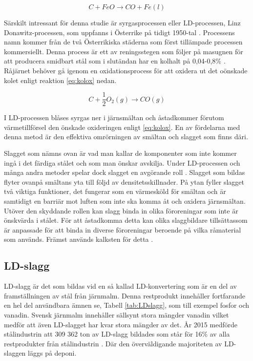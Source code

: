 \begin{equation}
    C+FeO \rightarrow CO + Fe(l)
    \label{eq:järnoxid}
\end{equation}

Särskilt intressant för denna studie är syrgasprocessen eller LD-processen, Linz Donawitz-processen, som uppfanns i Österrike på tidigt 1950-tal \cite{Jernkontoret2000del1}.
Processens namn kommer från de två Österrikiska städerna som först tillämpade processen kommersiellt. Denna process är ett av reningsstegen som följer på masugnen för att producera smidbart stål som i slutändan har en kolhalt på 0,04-0,8\% \cite{Jernkontoret2000del2}.
Råjärnet behöver gå igenom en oxidationsprocess för att oxidera ut det oönskade kolet enligt reaktion \eqref{eq:kolox} nedan.

\begin{equation}
    C +\frac{1}{2} O_{2}(g) \rightarrow CO(g)
    \label{eq:kolox}
\end{equation}

I LD-processen blåses syrgas ner i järnsmältan och åstadkommer förutom värmetillförsel den önskade oxideringen enligt \eqref{eq:kolox}. En av fördelarna med denna metod är den effektiva omrörningen av smältan och slagget som finns däri.

Slagget som nämns ovan är vad man kallar de komponenter som inte kommer ingå i det färdiga stålet och som man önskar avskilja. Under LD-processen och många andra metoder spelar dock slagget en avgörande roll  \cite{Slagg-Jernkontoret}. 
Slagget som bildas flyter ovanpå smältans yta till följd av densitetsskillnader. På ytan fyller slagget två viktiga funktioner, det fungerar som en värmesköld för smältan och är samtidigt en barriär mot luften som inte ska komma åt och oxidera järnsmältan. Utöver den skyddande rollen kan slagg binda in olika föroreningar som inte är önskvärda i stålet. För att åstadkomma detta kan olika slaggbildare tillsättassom är anpassade för att binda in diverse föroreningar beroende på vilka råmaterial som används. Främst används kalksten för detta \cite{RobertVikman}.

\subsection{LD-slagg}
LD-slagg är det som bildas vid en så kallad LD-konvertering som är en del av framställningen av stål från järnmalm. Denna restprodukt innehåller fortfarande en hel del användbara ämnen se, Tabell \ref{tab:LDslagg},  som till exempel fosfor och vanadin. Svensk järnmalm innehåller sällsynt stora mängder vanadin vilket medför att även LD-slagget har kvar stora mängder av det. År 2015 medförde stålindustrin att 309 362 ton av LD-slagg bildades som står för 16\% av alla restprodukter från stålindustrin \cite{Jernkontoretrest}. Där den överväldigande majoriteten av LD-slaggen läggs på deponi.


